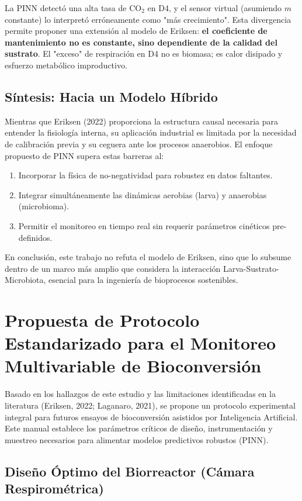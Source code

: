 La PINN detectó una alta tasa de CO$_2$ en D4, y el sensor virtual (asumiendo $m$ constante) lo interpretó erróneamente como "más crecimiento". Esta divergencia permite proponer una extensión al modelo de Eriksen: \textbf{el coeficiente de mantenimiento no es constante, sino dependiente de la calidad del sustrato}.
El "exceso" de respiración en D4 no es biomasa; es calor disipado y esfuerzo metabólico improductivo.

\section{Síntesis: Hacia un Modelo Híbrido}

Mientras que Eriksen (2022) proporciona la estructura causal necesaria para entender la fisiología interna, su aplicación industrial es limitada por la necesidad de calibración previa y su ceguera ante los procesos anaerobios.
El enfoque propuesto de PINN supera estas barreras al:
\begin{enumerate}
    \item Incorporar la física de no-negatividad para robustez en datos faltantes.
    \item Integrar simultáneamente las dinámicas aerobias (larva) y anaerobias (microbioma).
    \item Permitir el monitoreo en tiempo real sin requerir parámetros cinéticos pre-definidos.
\end{enumerate}

En conclusión, este trabajo no refuta el modelo de Eriksen, sino que lo subsume dentro de un marco más amplio que considera la interacción Larva-Sustrato-Microbiota, esencial para la ingeniería de bioprocesos sostenibles.
\chapter{Propuesta de Protocolo Estandarizado para el Monitoreo Multivariable de Bioconversión}

Basado en los hallazgos de este estudio y las limitaciones identificadas en la literatura (Eriksen, 2022; Laganaro, 2021), se propone un protocolo experimental integral para futuros ensayos de bioconversión asistidos por Inteligencia Artificial. Este manual establece los parámetros críticos de diseño, instrumentación y muestreo necesarios para alimentar modelos predictivos robustos (PINN).

\section{Diseño Óptimo del Biorreactor (Cámara Respirométrica)}


